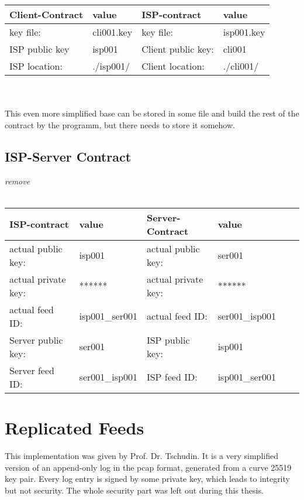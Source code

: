 \\\\
\begin{tabular}{llll} \toprule
    Client-Contract&value&ISP-contract&value\\ \midrule
    key file:& cli001.key &  key file: &isp001.key  \\ 
    ISP public key&isp001&Client public key:&cli001\\
    ISP location:&.\slash isp001\slash &Client location:& .\slash cli001\slash \\\bottomrule
\end{tabular}
\\\\
This even more simplified base can be stored in some file and build the rest of the contract by the programm, but there needs to store it somehow.
\subsection{ISP-Server Contract}
\textit{remove}\\\\
\begin{tabular}{llllll} \toprule
    ISP-contract&value&Server-Contract&value\\ \midrule
    actual public key:& isp001 &  actual public key: &ser001   \\ 
    actual private key:& ****** & actual private key:& ******  \\
    actual feed ID:& isp001\_ser001 &actual feed ID:&ser001\_isp001\\ 
    Server public key:&ser001&ISP public key:&isp001\\
    Server feed ID:&ser001\_isp001&ISP feed ID:&isp001\_ser001\\\bottomrule
\end{tabular}
\section{Replicated Feeds}
This implementation was given by Prof. Dr. Tschudin. It is a very simplified version of an append-only log in the pcap format, generated from a curve 25519 key pair. Every log entry is signed by some private key, which leads to integrity but not security. The whole security part was left out during this thesis.
